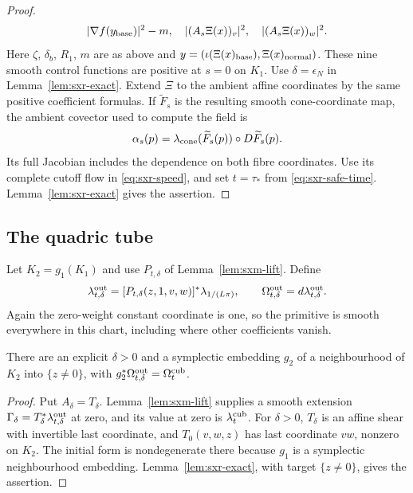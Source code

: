 \begin{proof}
\[\begin{gathered}
 |\nabla f(y_{\rm base})|^2-m,\quad
 |(A_s\Xi(x))_v|^2,\quad |(A_s\Xi(x))_w|^2.
 \end{gathered}
\]
Here $\zeta$, $\delta_b$, $R_1$, $m$ are as above and
$y=(\iota(\Xi(x)_{\rm base}),\Xi(x)_{\rm normal})$. These nine smooth control functions are positive at $s=0$ on $K_1$.
Use $\delta=\epsilon_N$ in Lemma~\ref{lem:sxr-exact}.
Extend $\Xi$ to the ambient affine coordinates by the same positive coefficient formulas. If $\widetilde F_s$ is the resulting smooth cone-coordinate
map, the ambient covector used to compute the field is
\[
 \alpha_s(p)=\lambda_{\rm cone}(\widetilde F_s(p))\circ D\widetilde F_s(p).
\]
Its full Jacobian includes the dependence on both fibre coordinates.
Use its complete cutoff flow in \eqref{eq:sxr-speed}, and set $t=\tau_*$ from
\eqref{eq:sxr-safe-time}. Lemma~\ref{lem:sxr-exact} gives the assertion.
\end{proof}

\subsection{The quadric tube}\label{sec:sxr-return}

Let $K_2=g_1(K_1)$ and use $P_{t,\delta}$ of Lemma~\ref{lem:sxm-lift}.
Define
\[
 \lambda_{t,\delta}^{\rm out}
  =[P_{t,\delta}(z,1,v,w)]^*\lambda_{1/(L\pi)},\qquad
 \Omega_{t,\delta}^{\rm out}=d\lambda_{t,\delta}^{\rm out}.
\]
Again the zero-weight constant coordinate is one, so the primitive is smooth everywhere in this
chart, including where other coefficients vanish.

\begin{proposition}\label{prop:sxr-quadric-return}
There are an explicit $\delta>0$ and a symplectic embedding $g_2$ of a neighbourhood of $K_2$
into $\{z\ne0\}$, with $g_2^*\Omega_{t,\delta}^{\rm out}=\Omega_t^{\rm cub}$.
\end{proposition}

\begin{proof}
Put $A_\delta=T_\delta$. Lemma~\ref{lem:sxm-lift} supplies a smooth extension
$\Gamma_\delta=T_\delta^*\lambda_{t,\delta}^{\rm out}$ at zero, and its value at
zero is $\lambda_t^{\rm cub}$. For $\delta>0$, $T_\delta$ is an affine shear with invertible last
coordinate, and $T_0(v,w,z)$ has last coordinate $vw$, nonzero on $K_2$. The initial form is nondegenerate there because $g_1$ is a symplectic
neighbourhood embedding. Lemma~\ref{lem:sxr-exact}, with target $\{z\ne0\}$,
gives the assertion.
\end{proof}

